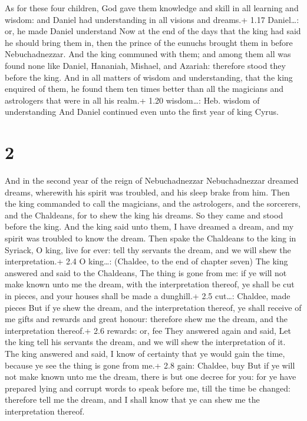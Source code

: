  As for these four children, God gave them knowledge and
skill in all learning and wisdom: and Daniel had understanding in all
visions and dreams.+ 1.17 Daniel\ldots: or, he made Daniel understand
 Now at the end of the days that the king had said he
should bring them in, then the prince of the eunuchs brought them in
before Nebuchadnezzar.  And the king communed with them;
and among them all was found none like Daniel, Hananiah, Mishael, and
Azariah: therefore stood they before the king.  And in all
matters of wisdom and understanding, that the king enquired of them, he
found them ten times better than all the magicians and astrologers that
were in all his realm.+ 1.20 wisdom\ldots: Heb. wisdom of understanding
 And Daniel continued even unto the first year of king
Cyrus.

\hypertarget{section-1}{%
\section{2}\label{section-1}}

 And in the second year of the reign of Nebuchadnezzar
Nebuchadnezzar dreamed dreams, wherewith his spirit was troubled, and
his sleep brake from him.  Then the king commanded to call
the magicians, and the astrologers, and the sorcerers, and the
Chaldeans, for to shew the king his dreams. So they came and stood
before the king.  And the king said unto them, I have
dreamed a dream, and my spirit was troubled to know the dream.
 Then spake the Chaldeans to the king in Syriack, O king,
live for ever: tell thy servants the dream, and we will shew the
interpretation.+ 2.4 O king\ldots: (Chaldee, to the end of chapter
seven)  The king answered and said to the Chaldeans, The
thing is gone from me: if ye will not make known unto me the dream, with
the interpretation thereof, ye shall be cut in pieces, and your houses
shall be made a dunghill.+ 2.5 cut\ldots: Chaldee, made pieces
 But if ye shew the dream, and the interpretation thereof,
ye shall receive of me gifts and rewards and great honour: therefore
shew me the dream, and the interpretation thereof.+ 2.6 rewards: or, fee
 They answered again and said, Let the king tell his
servants the dream, and we will shew the interpretation of it.
 The king answered and said, I know of certainty that ye
would gain the time, because ye see the thing is gone from me.+ 2.8
gain: Chaldee, buy  But if ye will not make known unto me
the dream, there is but one decree for you: for ye have prepared lying
and corrupt words to speak before me, till the time be changed:
therefore tell me the dream, and I shall know that ye can shew me the
interpretation thereof.

